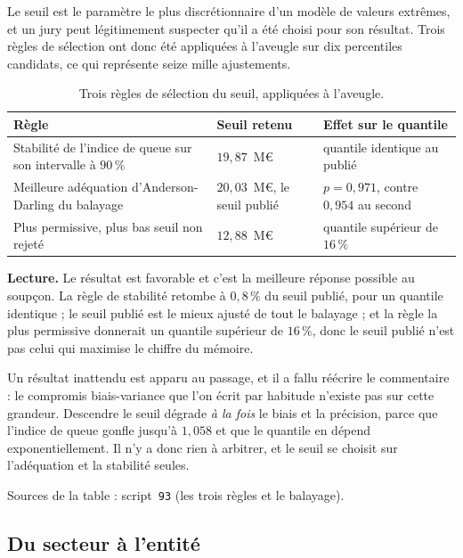 \documentclass[12pt,a4paper]{article}
\theoremstyle{definition}
\begin{document}
Le seuil est le paramètre le plus discrétionnaire d'un modèle de valeurs extrêmes,
et un jury peut légitimement suspecter qu'il a été choisi pour son résultat. Trois
règles de sélection ont donc été appliquées à l'aveugle sur dix percentiles
candidats, ce qui représente seize mille ajustements.

\begin{table}[htbp]
\centering\small
\renewcommand{\arraystretch}{1.2}
\begin{tabular}{@{}>{\raggedright\arraybackslash}p{5.8cm}>{\raggedright\arraybackslash}p{3.0cm}>{\raggedright\arraybackslash}p{4.6cm}@{}}
\toprule
\textbf{Règle} & \textbf{Seuil retenu} & \textbf{Effet sur le quantile} \\
\midrule
Stabilité de l'indice de queue sur son intervalle à $90\,\%$ &
$19{,}87$~M\euro &
quantile identique au publié \\
Meilleure adéquation d'Anderson-Darling du balayage &
$20{,}03$~M\euro, le seuil publié &
$p = 0{,}971$, contre $0{,}954$ au second \\
Plus permissive, plus bas seuil non rejeté &
$12{,}88$~M\euro &
quantile supérieur de $16\,\%$ \\
\bottomrule
\end{tabular}
\caption{Trois règles de sélection du seuil, appliquées à l'aveugle.}
\label{tab:seuil}
\end{table}

\textbf{Lecture.} Le résultat est favorable et c'est la meilleure réponse possible
au soupçon. La règle de stabilité retombe à $0{,}8\,\%$ du seuil publié, pour un
quantile identique ; le seuil publié est le mieux ajusté de tout le balayage ; et
la règle la plus permissive donnerait un quantile supérieur de $16\,\%$,
donc le seuil publié n'est pas celui qui maximise le chiffre du mémoire.

Un résultat inattendu est apparu au passage, et il a fallu réécrire le
commentaire : le compromis biais-variance que l'on écrit par habitude n'existe pas
sur cette grandeur. Descendre le seuil dégrade \emph{à la fois} le biais et la
précision, parce que l'indice de queue gonfle jusqu'à $1{,}058$ et que le quantile
en dépend exponentiellement. Il n'y a donc rien à arbitrer, et le seuil se choisit
sur l'adéquation et la stabilité seules.

\vspace{4pt}
\noindent Sources de la table : script~\texttt{93} (les trois règles et le
balayage).

\subsection{Du secteur à l'entité}
\label{ss:echelle}
\end{document}
